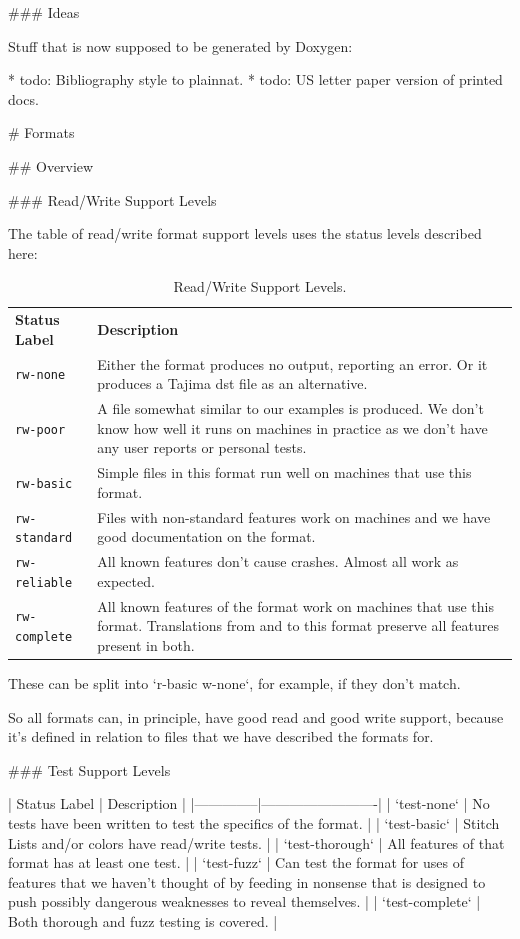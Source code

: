 ### Ideas

Stuff that is now supposed to be generated by Doxygen:

* todo: Bibliography style to plainnat.
* todo: US letter paper version of printed docs.

# Formats

## Overview

### Read/Write Support Levels

The table of read/write format support levels uses the status levels described here:

\begin{longtable}{p{4cm} p{8cm}}
\caption{Read/Write Support Levels.}
\label{tab:read-write-support} \\
\textbf{Status Label} &
\textbf{Description} \\

\texttt{rw-none} &
Either the format produces no output, reporting an error. Or it produces a
Tajima dst file as an alternative. \\

\texttt{rw-poor} &
A file somewhat similar to our examples is produced. We don't know how well
it runs on machines in practice as we don't have any user reports or personal
tests. \\

\texttt{rw-basic} &
Simple files in this format run well on machines that use this format. \\

\texttt{rw-standard} &
Files with non-standard features work on machines and we have good documentation
on the format. \\

\texttt{rw-reliable} &
All known features don't cause crashes. Almost all work as expected. \\

\texttt{rw-complete} &
All known features of the format work on machines that use this format.
Translations from and to this format preserve all features present in both.
\end{longtable}

These can be split into `r-basic w-none`, for example, if they don't match.

So all formats can, in principle, have good read and good write support, because it's defined in relation to files that we have described the formats for.

### Test Support Levels

| Status Label | Description             |
|--------------|-------------------------|
| `test-none` | No tests have been written to test the specifics of the format. |
| `test-basic` | Stitch Lists and/or colors have read/write tests. |
| `test-thorough` | All features of that format has at least one test. |
| `test-fuzz` | Can test the format for uses of features that we haven't thought of by feeding in nonsense that is designed to push possibly dangerous weaknesses to reveal themselves. |
| `test-complete` | Both thorough and fuzz testing is covered. |

